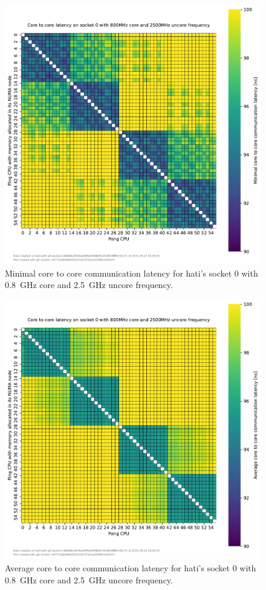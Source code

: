 \begin{figure}[]
    \centering
    \includegraphics[width=\columnwidth]{fig/core-to-core-latency/core-to-core-heatmap-min-800-2500.pdf}
    \caption{Minimal core to core communication latency for hati's socket 0 with \SI{0.8}{\GHz} core and \SI{2.5}{\GHz} uncore frequency.}
\end{figure}
\begin{figure}[]
    \centering
    \includegraphics[width=\columnwidth]{fig/core-to-core-latency/core-to-core-heatmap-avg-800-2500.pdf}
    \caption{Average core to core communication latency for hati's socket 0 with \SI{0.8}{\GHz} core and \SI{2.5}{\GHz} uncore frequency.}
\end{figure}
